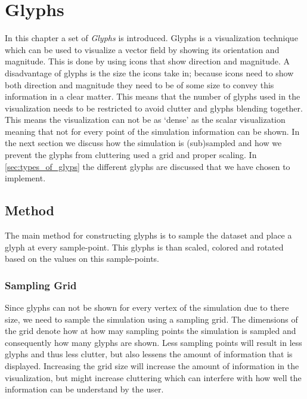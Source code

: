 \chapter{Glyphs} %
\label{cha:glyphs}
In this chapter a set of \emph{Glyphs} is introduced. Glyphs is a visualization technique which can be used to visualize a vector field by showing its orientation and magnitude. This is done by using icons that show direction and magnitude. A disadvantage of glyphs is the size the icons take in; because icons need to show both direction and magnitude they need to be of some size to convey this information in a clear matter. This means that the number of glyphs used in the visualization needs to be restricted to avoid clutter and glyphs blending together. This means the visualization can not be as `dense' as the scalar visualization meaning that not for every point of the simulation information can be shown. In the next section we discuss how the simulation is (sub)sampled and how we prevent the glyphs from cluttering used a grid and proper scaling. In \cref{sec:types_of_glyps} the different glyphs are discussed that we have chosen to implement.

\section{Method} %
\label{sec:method}
The main method for constructing glyphs is to sample the dataset and place a glyph at every sample-point. This glyphs is than scaled, colored and rotated based on the values on this sample-points. 

\subsection{Sampling Grid} %
\label{sub:sampling_grid}
Since glyphs can not be shown for every vertex of the simulation due to there size, we need to sample the simulation using a sampling grid. The dimensions of the grid denote how at how may sampling points the simulation is sampled and consequently how many glyphs are shown. Less sampling points will result in less glyphs and thus less clutter, but also lessens the amount of information that is displayed. Increasing the grid size will increase the amount of information in the visualization, but might increase cluttering which can interfere with how well the information can be understand by the user.


